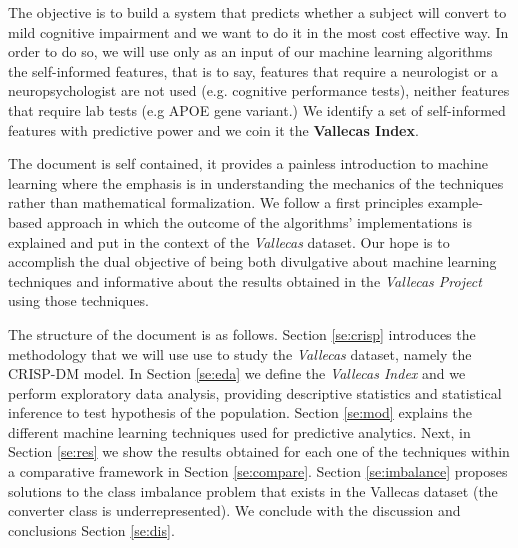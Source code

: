 \documentclass[11pt]{article}
\theoremstyle{definition}
\theoremstyle{remark}
\begin{document}
The objective is to build a system that predicts whether a subject will convert to mild cognitive impairment and we want to do it in the most cost effective way. In order to do so, we will use only as an input of our machine learning algorithms the self-informed features, that is to say, features that require a neurologist or a neuropsychologist are not used (e.g. cognitive performance tests), neither features that require lab tests (e.g APOE gene variant.)
We identify a set of self-informed features with predictive power and we coin it the \textbf{Vallecas Index}. 

The document is self contained, it provides a painless introduction to machine learning where the emphasis is in understanding the mechanics of the techniques rather than mathematical formalization. We follow a first principles example-based approach in which the outcome of the algorithms' implementations is explained and put in the context of the  \emph{Vallecas} dataset. Our hope is to accomplish the dual objective of being both divulgative about machine learning techniques and informative about the results obtained in the \emph{Vallecas Project} using those techniques.

The structure of the document is as follows. Section \ref{se:crisp} introduces the methodology that we will use use to study the \emph{Vallecas} dataset, namely the CRISP-DM model. In Section \ref{se:eda} we define the \emph{Vallecas Index} and we perform exploratory data analysis, providing descriptive statistics and statistical inference to test hypothesis of the population. Section \ref{se:mod} explains the different machine learning techniques used for predictive analytics. Next, in Section \ref{se:res} we show the results obtained for each one of the techniques within a comparative framework in Section \ref{se:compare}. Section \ref{se:imbalance} proposes solutions to the class imbalance problem that exists in the Vallecas dataset (the converter class is underrepresented). We conclude with the discussion and conclusions Section \ref{se:dis}.
\end{document}

